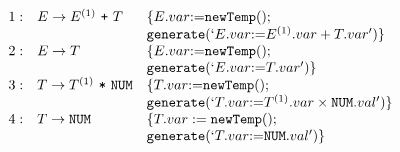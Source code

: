 \documentclass[dvipdfmx]{jarticle}
\begin{document}
\[
\begin{array}{lll}
1:& E\rightarrow E^{(1)}\ \texttt{+}\ T & \{E.var\mbox{:=}{\tt newTemp()};\\
  &                                & {\tt generate(`}{E.var}{\tt :=}{E^{(1)}.var+T.var}{\tt ')}\}\\
2:& E\rightarrow T                 & \{E.var\mbox{:=}{\tt newTemp()};\\
  &                                & {\tt generate(`}{E.var}{\tt :=}{T.var}{\tt ')}\}\\
3:& T\rightarrow T^{(1)}\ \texttt{*}\ \texttt{NUM} & \{T.var\mbox{:=}{\tt newTemp()};\\
  &                                     & {\tt generate(`}{T.var}{\tt :=}{T^{(1)}.var\times\texttt{NUM}.val}{\tt ')}\}\\
4:& T\rightarrow \texttt{NUM} & \{T.var:={\tt newTemp()};\\
  &                     & {\tt generate(`}{T.var}{\tt :=}{\texttt{NUM}.val}{\tt ')}\}
\end{array}
\]
\end{document}
